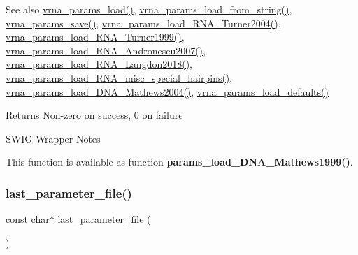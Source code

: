 \begin{DoxySeeAlso}{See also}
\mbox{\hyperlink{group__energy__parameters__rw_gabb0583595c67094986ef90cb4f1c7555}{vrna\+\_\+params\+\_\+load()}}, \mbox{\hyperlink{group__energy__parameters__rw_gabcd9cc7040a6b633b56b1cbd6a14d68e}{vrna\+\_\+params\+\_\+load\+\_\+from\+\_\+string()}}, \mbox{\hyperlink{group__energy__parameters__rw_ga0de3731b3e4017c52bd678549f6c4ae5}{vrna\+\_\+params\+\_\+save()}}, \mbox{\hyperlink{group__energy__parameters__rw_ga7327fe66ef60c33ba80a87c04db0ee83}{vrna\+\_\+params\+\_\+load\+\_\+\+R\+N\+A\+\_\+\+Turner2004()}}, \mbox{\hyperlink{group__energy__parameters__rw_ga804393b6dfe06a2c6cae89219dffabb1}{vrna\+\_\+params\+\_\+load\+\_\+\+R\+N\+A\+\_\+\+Turner1999()}}, \mbox{\hyperlink{group__energy__parameters__rw_ga511a1c17c0fd10a1fbb0936674712ff8}{vrna\+\_\+params\+\_\+load\+\_\+\+R\+N\+A\+\_\+\+Andronescu2007()}}, \mbox{\hyperlink{group__energy__parameters__rw_ga3a87fe5e73eb906c0fa26f2c42c787fd}{vrna\+\_\+params\+\_\+load\+\_\+\+R\+N\+A\+\_\+\+Langdon2018()}}, \mbox{\hyperlink{group__energy__parameters__rw_ga00e07504d66dc24aca7befb4bdaa0db1}{vrna\+\_\+params\+\_\+load\+\_\+\+R\+N\+A\+\_\+misc\+\_\+special\+\_\+hairpins()}}, \mbox{\hyperlink{group__energy__parameters__rw_gafa45b5734355baa634ca0a2e2857563e}{vrna\+\_\+params\+\_\+load\+\_\+\+D\+N\+A\+\_\+\+Mathews2004()}}, \mbox{\hyperlink{group__energy__parameters__rw_ga413bc688695c9a707dbcc678412d6792}{vrna\+\_\+params\+\_\+load\+\_\+defaults()}}
\end{DoxySeeAlso}
\begin{DoxyReturn}{Returns}
Non-\/zero on success, 0 on failure
\end{DoxyReturn}
\begin{DoxyRefDesc}{S\+W\+I\+G Wrapper Notes}
\item[\mbox{\hyperlink{wrappers__wrappers000108}{S\+W\+I\+G Wrapper Notes}}]This function is available as function {\bfseries{params\+\_\+load\+\_\+\+D\+N\+A\+\_\+\+Mathews1999()}}. \end{DoxyRefDesc}
\mbox{\label{group__energy__parameters__rw_ga5abafd7bad6d506e18bed13b18123cfe}} 
\subsubsection{\texorpdfstring{last\_parameter\_file()}{last\_parameter\_file()}}
{\footnotesize\ttfamily const char$\ast$ last\+\_\+parameter\+\_\+file (\begin{DoxyParamCaption}\item[{void}]{ }\end{DoxyParamCaption})}



